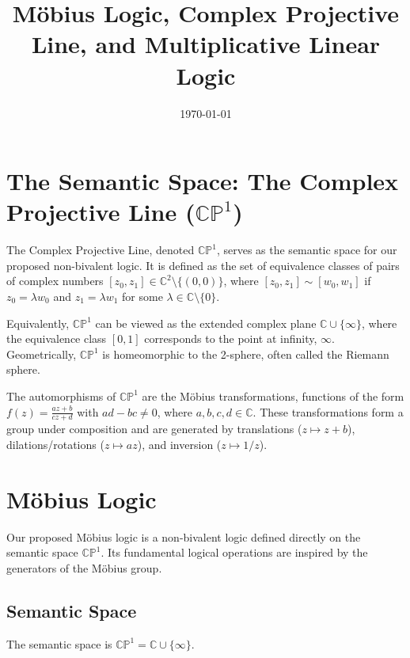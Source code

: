 \documentclass{article}
\title{Möbius Logic, Complex Projective Line, and Multiplicative Linear Logic}
\author{}
\date{\today}
\begin{document}
	
	\maketitle
	
	\section{The Semantic Space: The Complex Projective Line ($\mathbb{CP}^1$)}
	
	The Complex Projective Line, denoted $\mathbb{CP}^1$, serves as the semantic space for our proposed non-bivalent logic. It is defined as the set of equivalence classes of pairs of complex numbers $[z_0, z_1] \in \mathbb{C}^2 \setminus \{(0,0)\}$, where $[z_0, z_1] \sim [w_0, w_1]$ if $z_0 = \lambda w_0$ and $z_1 = \lambda w_1$ for some $\lambda \in \mathbb{C} \setminus \{0\}$.
	
	Equivalently, $\mathbb{CP}^1$ can be viewed as the extended complex plane $\mathbb{C} \cup \{\infty\}$, where the equivalence class $[0, 1]$ corresponds to the point at infinity, $\infty$. Geometrically, $\mathbb{CP}^1$ is homeomorphic to the 2-sphere, often called the Riemann sphere.
	
	The automorphisms of $\mathbb{CP}^1$ are the M\"{o}bius transformations, functions of the form $f(z) = \frac{az+b}{cz+d}$ with $ad-bc \neq 0$, where $a, b, c, d \in \mathbb{C}$. These transformations form a group under composition and are generated by translations ($z \mapsto z+b$), dilations/rotations ($z \mapsto az$), and inversion ($z \mapsto 1/z$).
	
	\section{Möbius Logic}
	
	Our proposed M\"{o}bius logic is a non-bivalent logic defined directly on the semantic space $\mathbb{CP}^1$. Its fundamental logical operations are inspired by the generators of the M\"{o}bius group.
	
	\subsection{Semantic Space}
	The semantic space is $\mathbb{CP}^1 = \mathbb{C} \cup \{\infty\}$.
	
\end{document}
